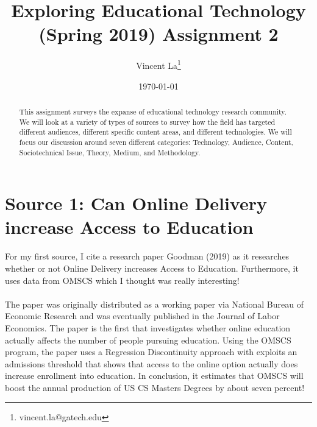 \documentclass[12pt, final]{article}
\renewcommand{\thefootnote}{$\star$}
\begin{document}
\title{Exploring Educational Technology (Spring 2019) Assignment 2}

\date{\today}

\renewcommand{\thefootnote}{$\dag$}
\author{Vincent La\footnote{vincent.la@gatech.edu}}

\maketitle

\begin{abstract}
This assignment surveys the expanse of educational technology research community. We will look at a variety of types of sources to survey how the field has targeted different audiences, different specific content areas, and different technologies. We will focus our discussion around seven different categories: Technology, Audience, Content, Sociotechnical Issue, Theory, Medium, and Methodology. 
\end{abstract} 

\newpage
\renewcommand{\thefootnote}{\number\value{footnote}} 
\section{Source 1: Can Online Delivery increase Access to Education} \label{Source 1}
For my first source, I cite a research paper Goodman (2019) \cite{Goodman} as it researches whether or not Online Delivery increases Access to Education. Furthermore, it uses data from OMSCS which I thought was really interesting!
\\
\\
The paper was originally distributed as a working paper via National Bureau of Economic Research and was eventually published in the Journal of Labor Economics. The paper is the first that investigates whether online education actually affects the number of people pursuing education. Using the OMSCS program, the paper uses a Regression Discontinuity approach with exploits an admissions threshold that shows that access to the online option actually does increase enrollment into education. In conclusion, it estimates that OMSCS will boost the annual production of US CS Masters Degrees by about seven percent!
\end{document}

